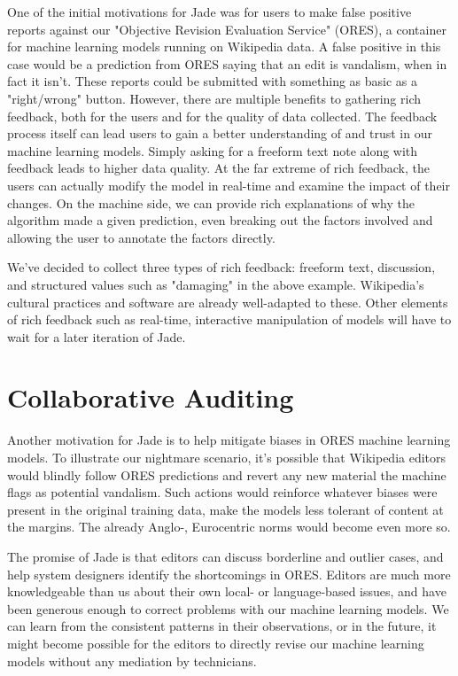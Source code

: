 \documentclass[sigconf, anonymous, review]{acmart}
\begin{document}
One of the initial motivations for Jade was for users to make false positive reports against our "Objective Revision Evaluation Service" (ORES), a container for machine learning models running on Wikipedia data.  A false positive in this case would be a prediction from ORES saying that an edit is vandalism, when in fact it isn't.  These reports could be submitted with something as basic as a "right/wrong" button.  However, there are multiple benefits to gathering rich feedback, both for the users and for the quality of data collected.  The feedback process itself can lead users to gain a better understanding of and trust in our machine learning models.  Simply asking for a freeform text note along with feedback leads to higher data quality.  At the far extreme of rich feedback, the users can actually modify the model in real-time and examine the impact of their changes.\cite{amershi2014power} \cite{stumpf2009interacting}  On the machine side, we can provide rich explanations of why the algorithm made a given prediction, even breaking out the factors involved and allowing the user to annotate the factors directly.

We've decided to collect three types of rich feedback: freeform text, discussion, and structured values such as "damaging" in the above example.  Wikipedia's cultural practices and software are already well-adapted to these.  Other elements of rich feedback such as real-time, interactive manipulation of models will have to wait for a later iteration of Jade.

\section{Collaborative Auditing}

Another motivation for Jade is to help mitigate biases in ORES machine learning models.  To illustrate our nightmare scenario, it's possible that Wikipedia editors would blindly follow ORES predictions and revert any new material the machine flags as potential vandalism.  Such actions would reinforce whatever biases were present in the original training data, make the models less tolerant of content at the margins.  The already Anglo-, Eurocentric norms\cite{ford2013getting} would become even more so.

The promise of Jade is that editors can discuss borderline and outlier cases, and help system designers identify the shortcomings in ORES.  Editors are much more knowledgeable than us about their own local- or language-based issues, and have been generous enough to correct problems with our machine learning models.  We can learn from the consistent patterns in their observations, or in the future, it might become possible for the editors to directly revise our machine learning models without any mediation by technicians.
\end{document}
